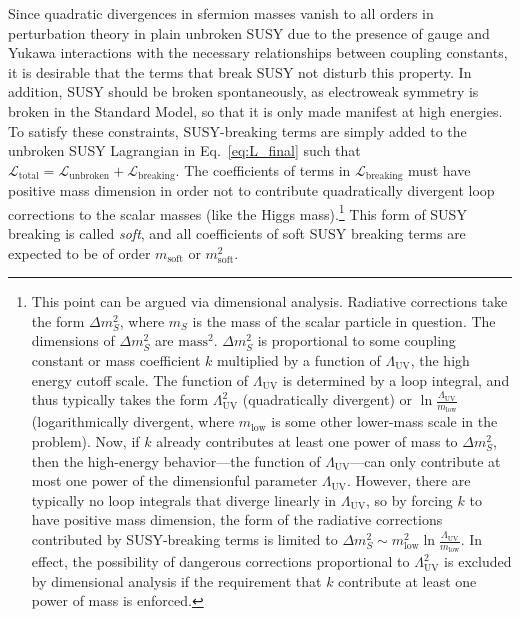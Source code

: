 \documentclass[dissertation.tex]{subfiles}
\begin{document}
Since quadratic divergences in sfermion masses vanish to all orders in perturbation theory in plain unbroken SUSY \cite{SUSY_primer} due to the presence of gauge and Yukawa interactions with the necessary relationships between coupling constants, it is desirable that the terms that break SUSY not disturb this property.  In addition, SUSY should be broken spontaneously, as electroweak symmetry is broken in the Standard Model, so that it is only made manifest at high energies.  To satisfy these constraints, SUSY-breaking terms are simply added to the unbroken SUSY Lagrangian in Eq.~\ref{eq:L_final} such that $\mathcal{L}_{\mathrm{total}} = \mathcal{L}_{\mathrm{unbroken}} + \mathcal{L}_{\mathrm{breaking}}$.  The coefficients of terms in $\mathcal{L}_{\mathrm{breaking}}$ must have positive mass dimension in order not to contribute quadratically divergent loop corrections to the scalar masses (like the Higgs mass).\footnote{This point can be argued via dimensional analysis.  Radiative corrections take the form $\Delta m_{S}^{2}$, where $m_{S}$ is the mass of the scalar particle in question.  The dimensions of $\Delta m_{S}^{2}$ are $\mbox{mass}^{2}$.  $\Delta m_{S}^{2}$ is proportional to some coupling constant or mass coefficient $k$ multiplied by a function of $\Lambda_{\mathrm{UV}}$, the high energy cutoff scale.  The function of $\Lambda_{\mathrm{UV}}$ is determined by a loop integral, and thus typically takes the form $\Lambda_{\mathrm{UV}}^{2}$ (quadratically divergent) or $\ln\frac{\Lambda_{\mathrm{UV}}}{m_{\mathrm{low}}}$ (logarithmically divergent, where $m_{\mathrm{low}}$ is some other lower-mass scale in the problem).  Now, if $k$ already contributes at least one power of mass to $\Delta m_{S}^{2}$, then the high-energy behavior---the function of $\Lambda_{\mathrm{UV}}$---can only contribute at most one power of the dimensionful parameter $\Lambda_{\mathrm{UV}}$.  However, there are typically no loop integrals that diverge linearly in $\Lambda_{\mathrm{UV}}$, so by forcing $k$ to have positive mass dimension, the form of the radiative corrections contributed by SUSY-breaking terms is limited to $\Delta m_{S}^{2} \sim m_{\mathrm{low}}^{2}\ln\frac{\Lambda_{\mathrm{UV}}}{m_{\mathrm{low}}}$.  In effect, the possibility of dangerous corrections proportional to $\Lambda_{\mathrm{UV}}^{2}$ is excluded by dimensional analysis if the requirement that $k$ contribute at least one power of mass is enforced.}  This form of SUSY breaking is called \textit{soft}, and all coefficients of soft SUSY breaking terms are expected to be of order $m_{\mathrm{soft}}$ or $m_{\mathrm{soft}}^{2}$.
\end{document}
